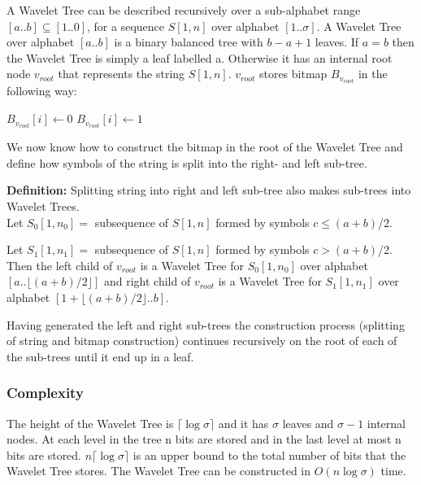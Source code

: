 		
A Wavelet Tree can be described recursively over a sub-alphabet range $[a .. b] \subseteq [1 .. 0]$, for a sequence $S[1,n]$ over alphabet $[1 .. \sigma]$. 
A Wavelet Tree over alphabet $[a .. b]$ is a binary balanced tree with $b - a + 1$ leaves. If $a = b$ then the Wavelet Tree is simply a leaf labelled a. 
Otherwise it has an internal root node $v_{root}$ that represents the string $S[1,n]$. $v_{root}$ stores bitmap $B_{v_{root}}$ in the following way:

\vspace{0.5 cm}
\begin{mdframed}[nobreak]
\begin{algorithmic}
	\State $B_{v_{root}}[i] \gets 0$
\Else
	\State $B_{v_{root}}[i] \gets 1$
\EndIf
\EndFunction
\end{algorithmic}
\end{mdframed}


We now know how to construct the bitmap in the root of the Wavelet Tree and define how symbols of the string is split into the right- and left sub-tree.


\vspace{0.5 cm}
\begin{mdframed}[nobreak]
\textbf{Definition:} Splitting string into right and left sub-tree also makes sub-trees into Wavelet Trees. \\

\noindent
Let $S_0[1,n_0] =$ subsequence of $S[1,n]$ formed by symbols $c \leq (a + b)$/2.

\noindent
Let $S_1[1,n_1] =$ subsequence of $S[1,n]$ formed by symbols $c > (a + b)$/2.
\\ \linebreak
\noindent
Then the left child of $v_{root}$ is a Wavelet Tree for $S_0[1,n_0]$ over alphabet $[a .. \lfloor (a + b)/2 \rfloor]$ and right child of $v_{root}$ is a Wavelet Tree for $S_1[1,n_1]$ over alphabet $[1 + \lfloor (a + b)/2 \rfloor .. b]$. 
\end{mdframed}
\vspace{0.5 cm}

Having generated the left and right sub-trees the construction process (splitting of string and bitmap construction) continues recursively on the root of each of the sub-trees until it end up in a leaf.

\subsubsection{Complexity}
The height of the Wavelet Tree is  $\lceil \log \sigma \rceil$ and it has $\sigma$ leaves and $\sigma - 1$ internal nodes. 
At each level in the tree n bits are stored and in the last level at most n bits are stored. $n \lceil \log \sigma \rceil$ is an upper bound to the total number of bits that the Wavelet Tree stores. 
The Wavelet Tree can be constructed in $O(n \log \sigma)$ time.

